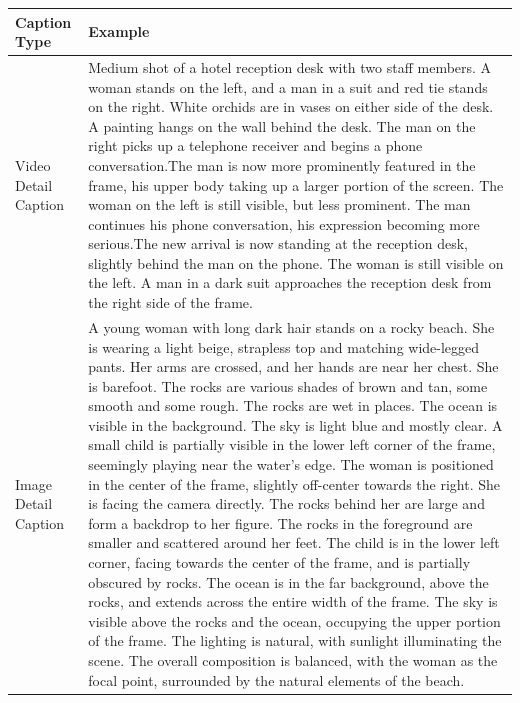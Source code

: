 \begin{table}
\centering
\small
\begin{tabular}{m{3cm}|p{10cm}}
\toprule
Caption Type & Example \\
\midrule
Video Detail Caption & Medium shot of a hotel reception desk with two staff members. A woman stands on the left, and a man in a suit and red tie stands on the right. White orchids are in vases on either side of the desk. A painting hangs on the wall behind the desk. The man on the right picks up a telephone receiver and begins a phone conversation.\newline\newline The man is now more prominently featured in the frame, his upper body taking up a larger portion of the screen. The woman on the left is still visible, but less prominent. The man continues his phone conversation, his expression becoming more serious.\newline\newline The new arrival is now standing at the reception desk, slightly behind the man on the phone. The woman is still visible on the left. A man in a dark suit approaches the reception desk from the right side of the frame.\\
\midrule
Image Detail Caption & A young woman with long dark hair stands on a rocky beach. She is wearing a light beige, strapless top and matching wide-legged pants. Her arms are crossed, and her hands are near her chest. She is barefoot. The rocks are various shades of brown and tan, some smooth and some rough. The rocks are wet in places. The ocean is visible in the background. The sky is light blue and mostly clear. A small child is partially visible in the lower left corner of the frame, seemingly playing near the water's edge. The woman is positioned in the center of the frame, slightly off-center towards the right. She is facing the camera directly. The rocks behind her are large and form a backdrop to her figure. The rocks in the foreground are smaller and scattered around her feet. The child is in the lower left corner, facing towards the center of the frame, and is partially obscured by rocks. The ocean is in the far background, above the rocks, and extends across the entire width of the frame. The sky is visible above the rocks and the ocean, occupying the upper portion of the frame. The lighting is natural, with sunlight illuminating the scene. The overall composition is balanced, with the woman as the focal point, surrounded by the natural elements of the beach. \\

\end{tabular}
\end{table}
